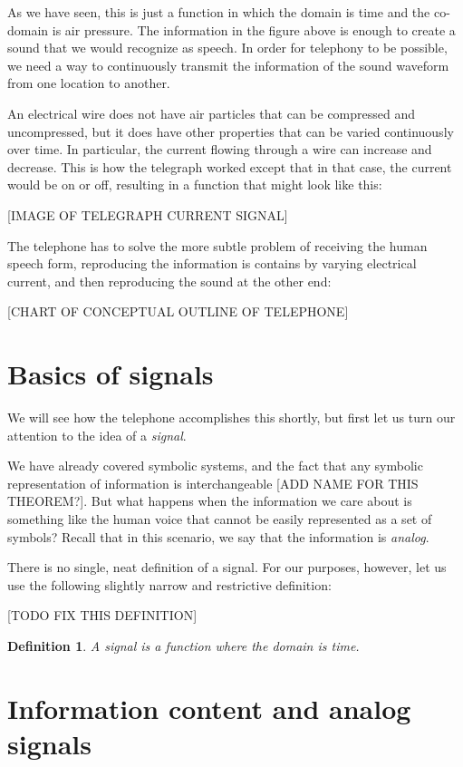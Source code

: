 \documentclass[UTF8]{book}
\newtheorem{definition}{Definition}
\begin{document}
\begin{CJK}{UTF8}{gbsn}
As we have seen, this is just a function in which the domain is time and the co-domain is air pressure. The information in the figure above is enough to create a sound that we would recognize as speech. In order for telephony to be possible, we need a way to continuously transmit the information of the sound waveform from one location to another.

An electrical wire does not have air particles that can be compressed and uncompressed, but it does have other properties that can be varied continuously over time. In particular, the current flowing through a wire can increase and decrease. This is how the telegraph worked except that in that case, the current would be on or off, resulting in a function that might look like this:

[IMAGE OF TELEGRAPH CURRENT SIGNAL]

The telephone has to solve the more subtle problem of receiving the human speech form, reproducing the information is contains by varying electrical current, and then reproducing the sound at the other end:

[CHART OF CONCEPTUAL OUTLINE OF TELEPHONE]

\section{Basics of signals}

We will see how the telephone accomplishes this shortly, but first let us turn our attention to the idea of a \emph{signal}.

We have already covered symbolic systems, and the fact that any symbolic representation of information is interchangeable [ADD NAME FOR THIS THEOREM?]. But what happens when the information we care about is something like the human voice that cannot be easily represented as a set of symbols? Recall that in this scenario, we say that the information is \emph{analog}.

There is no single, neat definition of a signal. For our purposes, however, let us use the following slightly narrow and restrictive definition:

[TODO FIX THIS DEFINITION]

\begin{definition}
A \emph{signal} is a function where the domain is time.
\end{definition}

\section{Information content and analog signals}


\end{CJK}
\end{document}
